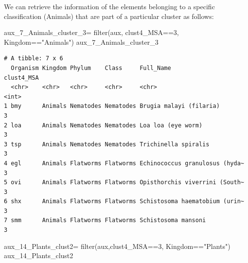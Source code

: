 \documentclass[
  letterpaper,
  DIV=11,
  numbers=noendperiod]{scrreprt}
\newenvironment{Shaded}{}{}
\newcommand{\DecValTok}[1]{\textcolor[rgb]{0.82,0.60,0.40}{#1}}
\newcommand{\FunctionTok}[1]{\textcolor[rgb]{0.38,0.69,0.94}{#1}}
\newcommand{\NormalTok}[1]{\textcolor[rgb]{0.67,0.70,0.75}{#1}}
\newcommand{\OtherTok}[1]{\textcolor[rgb]{0.15,0.68,0.38}{#1}}
\newcommand{\SpecialCharTok}[1]{\textcolor[rgb]{0.34,0.71,0.76}{#1}}
\newcommand{\StringTok}[1]{\textcolor[rgb]{0.60,0.76,0.47}{#1}}
\begin{document}
We can retrieve the information of the elements belonging to a specific
classification (Animals) that are part of a particular cluster as
follows:

\begin{Shaded}
\begin{Highlighting}[]
\NormalTok{aux\_7\_Animals\_cluster\_3}\OtherTok{=} \FunctionTok{filter}\NormalTok{(aux,}
\NormalTok{                                clust4\_MSA}\SpecialCharTok{==}\DecValTok{3}\NormalTok{,}
\NormalTok{                                Kingdom}\SpecialCharTok{==}\StringTok{"Animals"}\NormalTok{)}
\NormalTok{aux\_7\_Animals\_cluster\_3}
\end{Highlighting}
\end{Shaded}

\begin{verbatim}
# A tibble: 7 x 6
  Organism Kingdom Phylum    Class     Full_Name                      clust4_MSA
  <chr>    <chr>   <chr>     <chr>     <chr>                               <int>
1 bmy      Animals Nematodes Nematodes Brugia malayi (filaria)                 3
2 loa      Animals Nematodes Nematodes Loa loa (eye worm)                      3
3 tsp      Animals Nematodes Nematodes Trichinella spiralis                    3
4 egl      Animals Flatworms Flatworms Echinococcus granulosus (hyda~          3
5 ovi      Animals Flatworms Flatworms Opisthorchis viverrini (South~          3
6 shx      Animals Flatworms Flatworms Schistosoma haematobium (urin~          3
7 smm      Animals Flatworms Flatworms Schistosoma mansoni                     3
\end{verbatim}

\begin{Shaded}
\begin{Highlighting}[]
\NormalTok{aux\_14\_Plants\_clust2}\OtherTok{=} \FunctionTok{filter}\NormalTok{(aux,clust4\_MSA}\SpecialCharTok{==}\DecValTok{3}\NormalTok{,}
\NormalTok{                             Kingdom}\SpecialCharTok{==}\StringTok{"Plants"}\NormalTok{)}
\NormalTok{aux\_14\_Plants\_clust2}
\end{Highlighting}
\end{Shaded}
\end{document}
